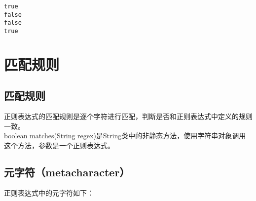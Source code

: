 \begin{tcolorbox}
	\begin{verbatim}
true
false
false
true
	\end{verbatim}
\end{tcolorbox}

\newpage

\section{匹配规则}

\subsection{匹配规则}

正则表达式的匹配规则是逐个字符进行匹配，判断是否和正则表达式中定义的规则一致。 \\

boolean matches(String regex)是String类中的非静态方法，使用字符串对象调用这个方法，参数是一个正则表达式。

\subsection{元字符（metacharacter）}

正则表达式中的元字符如下：

